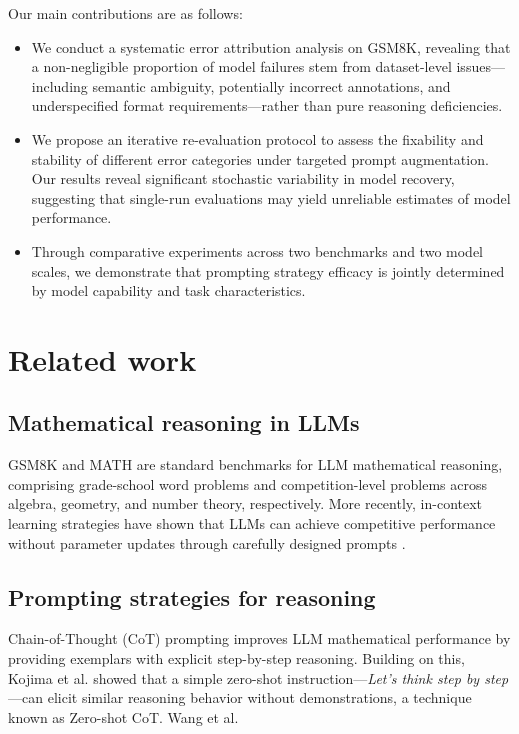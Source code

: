\documentclass{article}
\begin{document}
Our main contributions are as follows:
\begin{itemize}
    \item We conduct a systematic error attribution analysis on GSM8K, revealing that a non-negligible proportion of model failures stem from dataset-level issues---including semantic ambiguity, potentially incorrect annotations, and underspecified format requirements---rather than pure reasoning deficiencies.
    
    \item We propose an iterative re-evaluation protocol to assess the fixability and stability of different error categories under targeted prompt augmentation. Our results reveal significant stochastic variability in model recovery, suggesting that single-run evaluations may yield unreliable estimates of model performance.
    
    \item Through comparative experiments across two benchmarks and two model scales, we demonstrate that prompting strategy efficacy is jointly determined by model capability and task characteristics.
\end{itemize}


\section{Related work}

\subsection{Mathematical reasoning in LLMs}
GSM8K \cite{cobbe2021training} and MATH \cite{hendrycks2021measuring} are standard benchmarks for LLM mathematical reasoning, comprising grade-school word problems and competition-level problems across algebra, geometry, and number theory, respectively. More recently, in-context learning strategies have shown that LLMs can achieve competitive performance without parameter updates through carefully designed prompts \cite{brown2020language}.

\subsection{Prompting strategies for reasoning}
Chain-of-Thought (CoT) prompting \cite{wei2022chain} improves LLM mathematical performance by providing exemplars with explicit step-by-step reasoning. Building on this, Kojima et al. \cite{kojima2022large} showed that a simple zero-shot instruction---\textit{Let's think step by step}---can elicit similar reasoning behavior without demonstrations, a technique known as Zero-shot CoT. Wang et al. 
\end{document}
